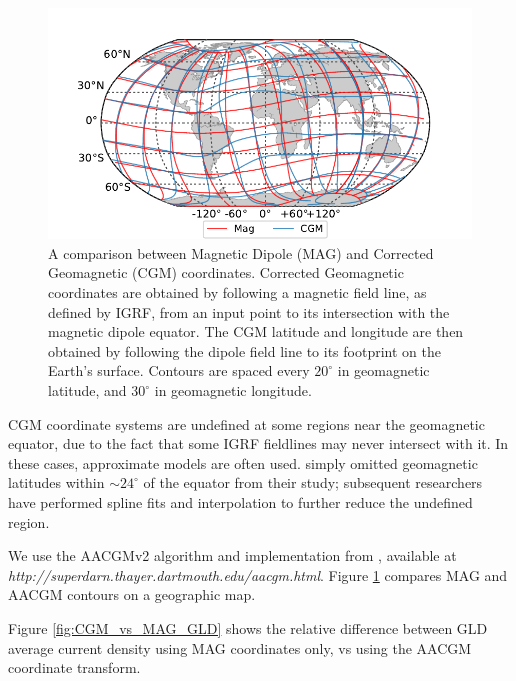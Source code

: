 \begin{figure}[t]
\begin{center}
\includegraphics{figures/CGM_globe_comparison.pdf}
\caption[Comparison of Magnetic Dipole (MAG) and Corrected Geomagnetic (CGM) coordinates]{A comparison between Magnetic Dipole (MAG) and Corrected Geomagnetic (CGM) coordinates. Corrected Geomagnetic coordinates are obtained by following a magnetic field line, as defined by IGRF, from an input point to its intersection with the magnetic dipole equator. The CGM latitude and longitude are then obtained by following the dipole field line to its footprint on the Earth's surface. Contours are spaced every $20^\circ$ in geomagnetic latitude, and $30^\circ$ in geomagnetic longitude.}
\label{fig:CGM_globe_comparison}
\end{center}
\end{figure}    

CGM coordinate systems are undefined at some regions near the geomagnetic equator, due to the fact that some IGRF fieldlines may never intersect with it. In these cases, approximate models are often used. \cite{Baker1989} simply omitted geomagnetic latitudes within $\sim 24^\circ$ of the equator from their study; subsequent researchers have performed spline fits and interpolation to further reduce the undefined region.

We use the AACGMv2 algorithm and implementation from \cite{Shepherd2014}, available at \emph{http://superdarn.thayer.dartmouth.edu/aacgm.html}. Figure \ref{fig:CGM_globe_comparison} compares MAG and AACGM contours on a geographic map.

Figure \ref{fig:CGM_vs_MAG_GLD} shows the relative difference between GLD average current density using MAG coordinates only, vs using the AACGM coordinate transform.



